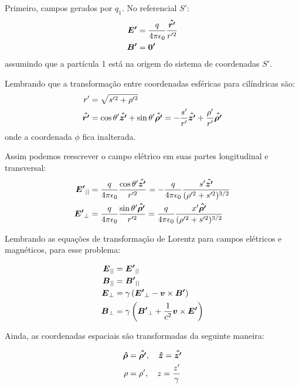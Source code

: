 \begin{apendicesenv}
    Primeiro, campos gerados por $q_1$. No referencial $S'$:
    \begin{align}
		\boldsymbol{E'} &= \frac{q}{4\pi\epsilon_0} \frac{\boldsymbol{\hat{r'}}}{r'^2} \\
		\boldsymbol{B'} &= \boldsymbol{0'}
    \end{align}
    assumindo que a partícula 1 está na origem do sistema de coordenadas $S'$.

    Lembrando que a transformação entre coordenadas esféricas para cilíndricas são:
    \begin{align}
		r' &= \sqrt{s'^2 + \rho'^2} \\
		\boldsymbol{\hat{r'}} &= \cos\theta'\boldsymbol{\hat{z'}} +
	 				   	   \sin\theta'\boldsymbol{\hat{\rho'}} =
    	-\frac{s'}{r'}\boldsymbol{\hat{z'}} + \frac{\rho'}{r'}\boldsymbol{\hat{\rho'}}
    \end{align}
    onde a coordenada $\phi$ fica inalterada.

    Assim podemos reescrever o campo elétrico em suas partes longitudinal e transversal:
    \begin{align}
		\boldsymbol{E'}_{||} &= \frac{q}{4\pi\epsilon_0} \frac{\cos\theta'\boldsymbol{\hat{z'}}}{r'^2} =
                 	-\frac{q}{4\pi\epsilon_0} \frac{s'\boldsymbol{\hat{z'}}}{(\rho'^2+s'^2)^{3/2}} \\
		\boldsymbol{E'}_{\perp} &= \frac{q}{4\pi\epsilon_0} \frac{\sin\theta'\boldsymbol{\hat{\rho'}}}{r'^2} =
                     \frac{q}{4\pi\epsilon_0} \frac{x'\boldsymbol{\hat{\rho'}}}{(\rho'^2+s'^2)^{3/2}}
    \end{align}

    Lembrando as equações de transformação de Lorentz para campos elétricos e magnéticos, para esse problema:

    \begin{align}
 		\boldsymbol{E}_{||} &= \boldsymbol{E'}_{||}\\
 		\boldsymbol{B}_{||} &= \boldsymbol{B'}_{||}\\
 		\boldsymbol{E}_\perp &= \gamma\left(\boldsymbol{E'}_\perp - \boldsymbol{v}\times\boldsymbol{B'}\right)\\
 		\boldsymbol{B}_\perp &= \gamma\left(\boldsymbol{B'}_\perp + \frac{1}{c^2}\boldsymbol{v}\times\boldsymbol{E'}\right)
    \end{align}

    Ainda, as coordenadas espaciais são transformadas da seguinte maneira:

    \begin{align}
		\boldsymbol{\hat{\rho}} &=\boldsymbol{\hat{\rho'}}, \quad \boldsymbol{\hat{z}} = \boldsymbol{\hat{z'}}\\
		\rho &= \rho', \quad z = \frac{z'}{\gamma}
    \end{align}


\end{apendicesenv}
